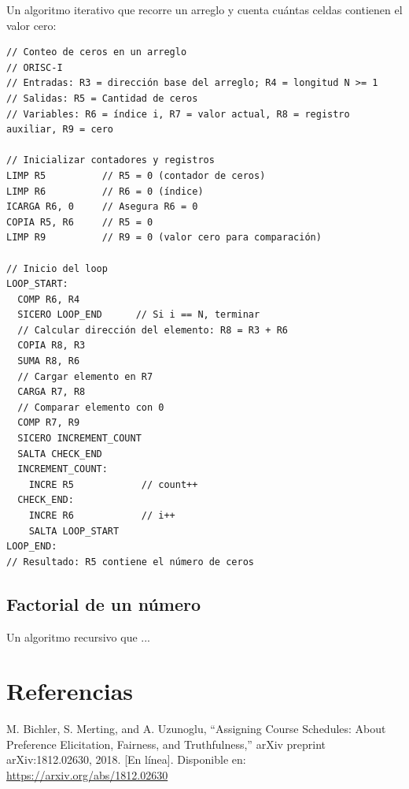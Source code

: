 \documentclass{article}
\begin{document}
Un algoritmo iterativo que recorre un arreglo y cuenta cuántas celdas contienen el valor cero:

\begin{verbatim}
// Conteo de ceros en un arreglo
// ORISC-I
// Entradas: R3 = dirección base del arreglo; R4 = longitud N >= 1
// Salidas: R5 = Cantidad de ceros
// Variables: R6 = índice i, R7 = valor actual, R8 = registro auxiliar, R9 = cero

// Inicializar contadores y registros
LIMP R5          // R5 = 0 (contador de ceros)
LIMP R6          // R6 = 0 (índice)
ICARGA R6, 0     // Asegura R6 = 0
COPIA R5, R6     // R5 = 0
LIMP R9          // R9 = 0 (valor cero para comparación)

// Inicio del loop
LOOP_START:
  COMP R6, R4
  SICERO LOOP_END      // Si i == N, terminar
  // Calcular dirección del elemento: R8 = R3 + R6
  COPIA R8, R3
  SUMA R8, R6
  // Cargar elemento en R7
  CARGA R7, R8
  // Comparar elemento con 0
  COMP R7, R9
  SICERO INCREMENT_COUNT
  SALTA CHECK_END
  INCREMENT_COUNT:
    INCRE R5            // count++
  CHECK_END:
    INCRE R6            // i++
    SALTA LOOP_START
LOOP_END:
// Resultado: R5 contiene el número de ceros
\end{verbatim}


\subsection{Factorial de un número}

Un algoritmo recursivo que ...



\section{Referencias}
\renewcommand{\refname}{}

\begin{thebibliography}{9}

   \label{ref:BPS} M. Bichler, S. Merting, and A. Uzunoglu,
  “Assigning Course Schedules: About Preference Elicitation, Fairness, and Truthfulness,”
  arXiv preprint arXiv:1812.02630, 2018. [En línea]. Disponible en:
  \url{https://arxiv.org/abs/1812.02630}


\end{thebibliography}
\end{document}
